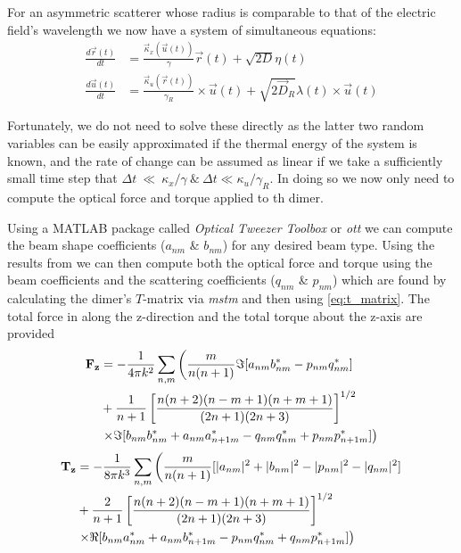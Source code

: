For an asymmetric scatterer whose radius is comparable to that of the 
electric field's wavelength we now have a system of simultaneous equations:
\begin{align}
	\label{eq:full_langevin}
  \frac{{d}\vec{r}(t)}{{dt}}
  &=
    \frac{\vec{\kappa}_x(\vec{u}(t))}{\gamma}\vec{r}(t) + \sqrt{2D}\eta(t)
  \\
  \frac{{d}\vec{u}(t)}{{dt}}
  &=
    \frac{\vec{\kappa}_u(\vec{r}(t))}{\gamma_R}\times \vec{u}(t)
    + \sqrt{2\vec{D}_R}\lambda(t)\times \vec{u}(t)
\end{align}

Fortunately, we do not need to solve these directly as the latter two
random variables can be easily approximated if the thermal energy of
the system is known, and the rate of change can be assumed as linear if
we take a sufficiently small time step that $\Delta t~\ll~\kappa_x/\gamma 
\ \& \ \Delta t \ll \kappa_u/\gamma_R$. In doing so we now only need 
to compute the optical force and torque applied to th dimer. 

Using a  MATLAB package called \textit{Optical Tweezer Toolbox} 
or \textit{ott} \cite{Nieminen2007} we can compute the beam 
shape coefficients ($a_{nm}$ \& $b_{nm}$) for any desired beam 
type. Using the results from \cite{Farsund1996} we can then 
compute both the optical force and torque using the beam 
coefficients and the scattering coefficients ($q_{nm}$ \& $p_{nm}$) 
which are found by calculating the dimer's $T$-matrix via \textit{mstm} \cite{Mackowski2011} and then using \eqref{eq:t_matrix}. The 
total force in along the z-direction and the total torque about 
the z-axis are provided
\begin{equation}
	\label{eq:optical_force}
\begin{split}
  \bold{F_z}
  &=
    -\frac{1}{4\pi k^2}\sum_{n,m} \left(\frac{m}{n(n+1)}\Im[a_{nm}b^*_{nm}-p_{nm}q^*_{nm}] \right.
  \\ 
  &+\frac{1}{n+1}\left[\frac{n(n+2)(n-m+1)(n+m+1)}{(2n+1)(2n+3)} \right]^{1/2}
  \\
  & \left.\times\Im[b_{nm}b^*_{nm}+a_{nm}a^*_{n+1m}-q_{nm}q^*_{nm}+p_{nm}p^*_{n+1m}] \right)
\end{split}
\end{equation}
\begin{equation}
\begin{split}
  \bold{T_z}
  &=
    -\frac{1}{8\pi k^3}\sum_{n,m} \left(\frac{m}{n(n+1)}[|a_{nm}|^2+|b_{nm}|^2-|p_{nm}|^2-|q_{nm}|^2] \right.
  \\ 
  &+\frac{2}{n+1}\left[\frac{n(n+2)(n-m+1)(n+m+1)}{(2n+1)(2n+3)} \right]^{1/2}
  \\
  & \left.\times\Re[b_{nm}a^*_{nm}+a_{nm}b^*_{n+1m}-p_{nm}q^*_{nm}+q_{nm}p^*_{n+1m}] \right)
\end{split}
\end{equation}

